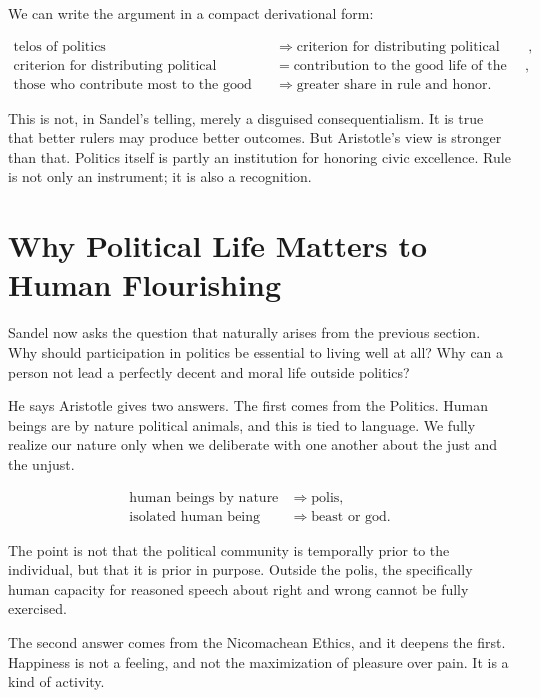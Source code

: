We can write the argument in a compact derivational form:

\begin{align}
\text{telos of politics}
&\Longrightarrow
\text{criterion for distributing political authority},\\
\text{criterion for distributing political authority}
&=
\text{contribution to the good life of the polis},\\
\text{those who contribute most to the good life of the polis}
&\Longrightarrow
\text{greater share in rule and honor}.
\end{align}

This is not, in Sandel's telling, merely a disguised consequentialism. It is true that better rulers may produce better outcomes. But Aristotle's view is stronger than that. Politics itself is partly an institution for honoring civic excellence. Rule is not only an instrument; it is also a recognition.

\section{Why Political Life Matters to Human Flourishing}

Sandel now asks the question that naturally arises from the previous section. Why should participation in politics be essential to living well at all? Why can a person not lead a perfectly decent and moral life outside politics?

He says Aristotle gives two answers. The first comes from the Politics. Human beings are by nature political animals, and this is tied to language. We fully realize our nature only when we deliberate with one another about the just and the unjust.

\begin{align}
\text{human beings by nature}
&\Longrightarrow
\text{polis},\\
\text{isolated human being}
&\Longrightarrow
\text{beast or god}.
\end{align}

The point is not that the political community is temporally prior to the individual, but that it is prior in purpose. Outside the polis, the specifically human capacity for reasoned speech about right and wrong cannot be fully exercised.

The second answer comes from the Nicomachean Ethics, and it deepens the first. Happiness is not a feeling, and not the maximization of pleasure over pain. It is a kind of activity.

